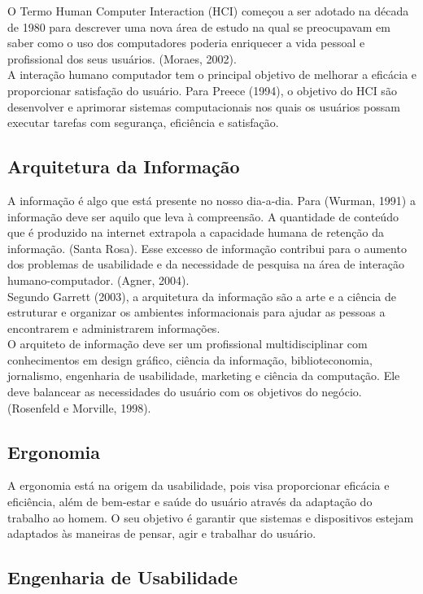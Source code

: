 	O Termo Human Computer Interaction  (HCI) começou a ser adotado na década de 1980 para descrever uma nova área de estudo na qual se preocupavam em saber como o uso dos computadores poderia enriquecer a vida pessoal e profissional dos seus usuários. (Moraes, 2002). \\
	A interação humano computador tem o principal objetivo de melhorar a eficácia e proporcionar satisfação do usuário. Para Preece (1994), o objetivo do HCI são desenvolver e aprimorar sistemas computacionais nos quais os usuários possam executar tarefas com segurança, eficiência e satisfação.

	
\subsection{Arquitetura da Informação}

A informação é algo que está presente no nosso dia-a-dia. Para (Wurman, 1991) a informação deve ser aquilo que leva à compreensão. A quantidade de conteúdo que é produzido na internet extrapola a capacidade humana de retenção da informação. (Santa Rosa). Esse excesso de informação contribui para o aumento dos problemas de usabilidade e da necessidade de pesquisa na área de interação humano-computador. (Agner, 2004).\\
Segundo Garrett (2003), a arquitetura da informação são a arte e a ciência de estruturar e organizar os ambientes informacionais para ajudar as pessoas a encontrarem e administrarem informações.\\
O arquiteto de informação deve ser um profissional multidisciplinar com conhecimentos em design gráfico, ciência da informação, biblioteconomia, jornalismo, engenharia de usabilidade, marketing e ciência da computação. Ele deve balancear as necessidades do usuário com os objetivos do negócio. (Rosenfeld e Morville, 1998).

\subsection{Ergonomia}

A ergonomia está na origem da usabilidade, pois visa proporcionar eficácia e eficiência, além de bem-estar e saúde do usuário através da adaptação do trabalho ao homem. O seu objetivo é garantir que sistemas e dispositivos estejam adaptados às maneiras de pensar, agir e trabalhar do usuário. ~\cite{cybis2010ergonomia}


\subsection{Engenharia de Usabilidade}

